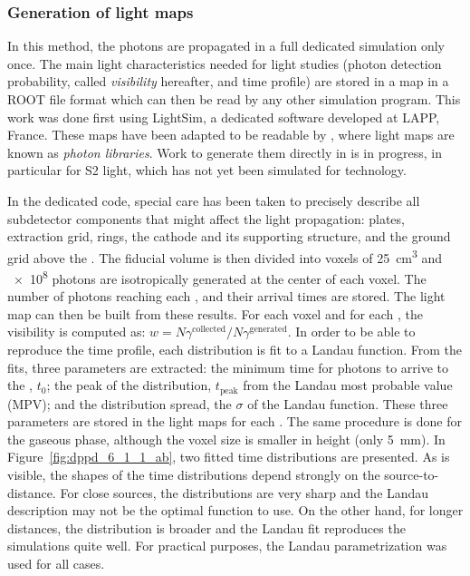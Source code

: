 \subsubsection{Generation of light maps}
\label{subsec:fddp-pd-6.1.1}

In this method, the photons are propagated in a full dedicated  simulation only once. The main light characteristics needed for light studies (photon detection probability, called \textit{visibility} hereafter, and time profile) are stored in a map in a ROOT \cite{root} file format which can then be read by any other simulation program. This work was done first using LightSim, a dedicated software developed at LAPP, France. These maps have been adapted to be readable by \larsoft, where light maps are known as \textit{photon libraries}. Work to generate them directly in \larsoft is in progress, in particular for S2 light, which has not yet been simulated for \dual technology.

In the dedicated   code, special care has been taken to precisely describe all subdetector components that might affect the light propagation:  plates, extraction grid,  rings, the cathode and its supporting structure, and the ground grid above the . The \lar fiducial volume is then divided into voxels of \SI{25}{cm^3} and \num{e8} photons are isotropically generated at the center of each voxel. The number of photons reaching each , and their arrival times are stored. The light map can then be built from these results. For each voxel and for each , the visibility is computed as: $w=N\gamma^{\textrm{collected}}/N\gamma^{\textrm{generated}}$. In order to be able to reproduce the time profile, each distribution is fit to a Landau function. From the fits, three parameters are extracted: the minimum time for photons to arrive to the , $t_0$; the peak of the distribution, $t_{\textrm{peak}}$ from the Landau most probable value (MPV); and the distribution spread, the $\sigma$ of the Landau function. These three parameters are stored in the light maps for each . The same procedure is done for the gaseous phase, although the voxel size is smaller in height (only \SI{5}{mm}). In Figure~\ref{fig:dppd_6_1_1_ab}, two fitted time distributions are presented. As is visible, the shapes of the time distributions depend strongly on the source-to- distance. For close sources, the distributions are very sharp and the Landau description may not be the optimal function to use. On the other hand, for longer distances, the distribution is broader and the Landau fit reproduces the simulations quite well. %
For practical purposes, the Landau parametrization was used for all cases.

